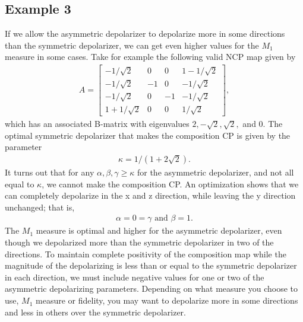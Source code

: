 \documentclass[12pt]{iopart}
\begin{document}
\subsection{Example 3}\label{subsec:ex3}
If we allow the asymmetric depolarizer to depolarize more in some directions than the symmetric depolarizer, we can get even higher values for the $M_1$ measure in some cases.
Take for example the following valid NCP map given by
\begin{align}\label{eq:Ex:maxDepolInSomeDirs}
    A = 
    \left[
    \begin{array}{cccc}
       -1/\sqrt{2} & 0 & 0 & 1 - 1/\sqrt{2} \\
       -1/\sqrt{2} & -1 & 0 & -1/\sqrt{2} \\
       -1/\sqrt{2} & 0 & -1 & -1/\sqrt{2} \\
       1 + 1/\sqrt{2} & 0 & 0 & 1/\sqrt{2}
    \end{array}
    \right],
\end{align}
which has an associated B-matrix with eigenvalues $2,-\sqrt{2},\sqrt{2},$ and $0$. The optimal symmetric depolarizer that makes the composition CP is given by the parameter 
\begin{align}
    \kappa = 1/(1+2 \sqrt{2}).    
\end{align}
It turns out that for any $\alpha, \beta, \gamma \geq \kappa$ for the asymmetric depolarizer, and not all equal to $\kappa$, we cannot make the composition CP. An optimization shows that we can completely depolarize in the x and z direction, while leaving the y direction unchanged; that is, 
\begin{align}
    \alpha = 0 = \gamma \text{ and }\beta = 1.
\end{align}
The $M_1$ measure is optimal and higher for the asymmetric depolarizer, even though we depolarized more than the symmetric depolarizer in two of the directions. To maintain complete positivity of the composition map while the magnitude of the depolarizing is less than or equal to the symmetric depolarizer in each direction, we must include negative values for one or two of the asymmetric depolarizing parameters. Depending on what measure you choose to use, $M_1$ measure or fidelity, you may want to depolarize more in some directions and less in others over the symmetric depolarizer.
\end{document}
